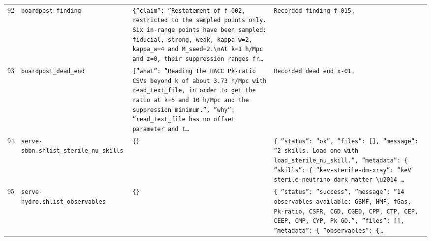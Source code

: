 \documentclass[11pt,a4paper]{article}
\begin{document}
\begin{longtable}{@{}p{}p{}p{}p{}@{}}
92 & \texttt{board}\newline\texttt{post\_\allowbreak{}finding} & \texttt{\{''claim'':\allowbreak{} ''Restatement of f-002,\allowbreak{} restricted to the sampled points only. Six in-range points have been sampled:\allowbreak{} fiducial,\allowbreak{} strong,\allowbreak{} weak,\allowbreak{} kappa\_\allowbreak{}w=\allowbreak{}2,\allowbreak{} kappa\_\allowbreak{}w=\allowbreak{}4 and M\_\allowbreak{}seed=\allowbreak{}2.\textbackslash{}\allowbreak{}nAt k=\allowbreak{}1 h/\allowbreak{}Mpc and z=\allowbreak{}0,\allowbreak{} their suppression ranges fr\ldots{}\allowbreak{}} & \texttt{Recorded finding f-015.} \\
93 & \texttt{board}\newline\texttt{post\_\allowbreak{}dead\_\allowbreak{}end} & \texttt{\{''what'':\allowbreak{} ''Reading the HACC Pk-ratio CSVs beyond k of about 3.73 h/\allowbreak{}Mpc with read\_\allowbreak{}text\_\allowbreak{}file,\allowbreak{} in order to get the ratio at k=\allowbreak{}5 and 10 h/\allowbreak{}Mpc and the suppression minimum.'',\allowbreak{} ''why'':\allowbreak{} ''read\_\allowbreak{}text\_\allowbreak{}file has no offset parameter and t\ldots{}\allowbreak{}} & \texttt{Recorded dead end x-01.} \\
94 & \texttt{serve-sbbn.sh}\newline\texttt{list\_\allowbreak{}sterile\_\allowbreak{}nu\_\allowbreak{}skills} & \texttt{\{\}\allowbreak{}} & \texttt{\{   ''status'':\allowbreak{} ''ok'',\allowbreak{}   ''files'':\allowbreak{} []\allowbreak{},\allowbreak{}   ''message'':\allowbreak{} ''2 skills. Load one with load\_\allowbreak{}sterile\_\allowbreak{}nu\_\allowbreak{}skill.'',\allowbreak{}   ''metadata'':\allowbreak{} \{     ''skills'':\allowbreak{} \{       ''kev-sterile-dm-xray'':\allowbreak{} ''keV sterile-neutrino dark matter \textbackslash{}\allowbreak{}u2014 \ldots{}\allowbreak{}} \\
95 & \texttt{serve-hydro.sh}\newline\texttt{list\_\allowbreak{}observables} & \texttt{\{\}\allowbreak{}} & \texttt{\{   ''status'':\allowbreak{} ''success'',\allowbreak{}   ''message'':\allowbreak{} ''14 observables available:\allowbreak{} GSMF,\allowbreak{} HMF,\allowbreak{} fGas,\allowbreak{} Pk-ratio,\allowbreak{} CSFR,\allowbreak{} CGD,\allowbreak{} CGED,\allowbreak{} CPP,\allowbreak{} CTP,\allowbreak{} CEP,\allowbreak{} CEEP,\allowbreak{} CMP,\allowbreak{} CYP,\allowbreak{} Pk\_\allowbreak{}GO.'',\allowbreak{}   ''files'':\allowbreak{} []\allowbreak{},\allowbreak{}   ''metadata'':\allowbreak{} \{     ''observables'':\allowbreak{} \{\ldots{}\allowbreak{}} \\

\end{longtable}
\end{document}
